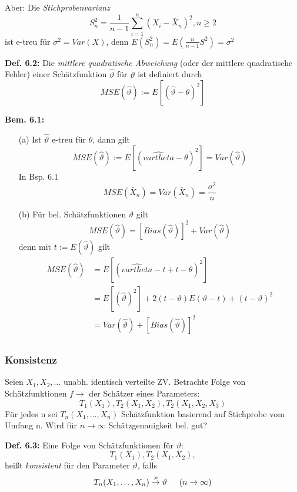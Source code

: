 \documentclass[a4paper,11pt]{article}
\begin{document}
\noindent Aber: Die \textit{Stichprobenvarianz}
\[S_n^2=\frac{1}{n-1}\sum_{i=1}^{n}(X_i-\bar{X}_n)^2, n\geq2\]
ist e-treu für $\sigma^2=Var(X)$, denn $E(S_n^2)=E(\frac{n}{n-1}S^2)=\sigma^2$

\vspace{6pt}
\noindent\textbf{Def. 6.2:} Die \textit{mittlere quadratische Abweichung} (oder der mittlere quadratische Fehler) einer Schätzfunktion $\hat{\vartheta}$ für $\vartheta$ ist definiert durch
\[MSE(\hat{\vartheta}):=E[(\hat{\vartheta}-\theta)^2]\]

\vspace{6pt}
\noindent\textbf{Bem. 6.1:}
\begin{itemize}
\item[(a)] Ist $\hat{\vartheta}$ e-treu für $\theta$, dann gilt 
\[MSE(\hat{\vartheta}):=E[(\hat{vartheta}-\theta)^2]=Var(\hat{\vartheta})\]
\noindent In Bsp. 6.1
\[MSE(\bar{X}_n)=Var(\bar{X}_n)=\frac{\sigma^2}{n}\]
\item[(b)] Für bel. Schätzfunktionen $\hat{\vartheta}$ gilt
\[MSE(\hat{\vartheta})=[Bias(\hat{\vartheta})]^2+Var(\hat{\vartheta})\]
\noindent denn mit $t:=E(\hat{\vartheta})$ gilt
\begin{align*}
MSE(\hat{\vartheta}) &= E[(\hat{vartheta}-t+t-\theta)^2]\\
&= E[(\hat{\vartheta})^2]+2(t-\vartheta)E(\vartheta-t)+(t-\vartheta)^2\\
&= Var(\hat{\vartheta}) + [Bias(\hat{\vartheta})]^2\\
\end{align*}
\end{itemize}

\subsubsection{Konsistenz}
Seien $X_1,X_2,\dots$ unabh. identisch verteilte ZV. 
\newline Betrachte Folge von Schätzfunktionen $f\rightarrow$ der Schätzer eines Parameters:
\[T_1(X_1),T_2(X_1,X_2),T_2(X_1,X_2,X_3)\]
Für jedes n sei $T_n(X_1,\dots,X_n)$ Schätzfunktion basierend auf Stichprobe vom Umfang n. 
\newline Wird für $n\rightarrow\infty$ Schätzgenauigkeit bel. gut?

\vspace{6pt}
\noindent\textbf{Def. 6.3:}
Eine Folge von Schätzfunktionen für $\vartheta$:
\[T_1(X_1),T_2(X_1,X_2),\]
heißt \textit{konsistent} für den Parameter $\vartheta$, falls 
\[T_n(X_1,\dots,X_n) \overset{\mathclap{\scriptscriptstyle P}}{\rightarrow}\vartheta \hspace{15pt} (n\rightarrow\infty)\]
\end{document}
